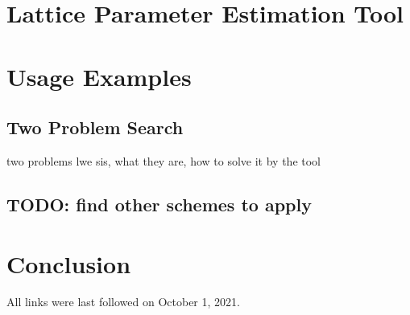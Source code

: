 \documentclass[
  a4paper,  %
  twoside,  %
  bibliography=totoc,
  headsepline,
  cleardoublepage=empty,
  parskip=half,
  draft=false
]{scrbook}
\begin{document}
\chapter{Lattice Parameter Estimation Tool}



\chapter{Usage Examples}
\section{Two Problem Search}\label{sec:two-problem-search}
two problems lwe sis, what they are, how to solve it by the tool
\section{TODO: find other schemes to apply}


\chapter{Conclusion}

\printbibliography

All links were last followed on October 1, 2021.


\pagestyle{empty}
\renewcommand*{\chapterpagestyle}{empty}
\Versicherung
\end{document}
